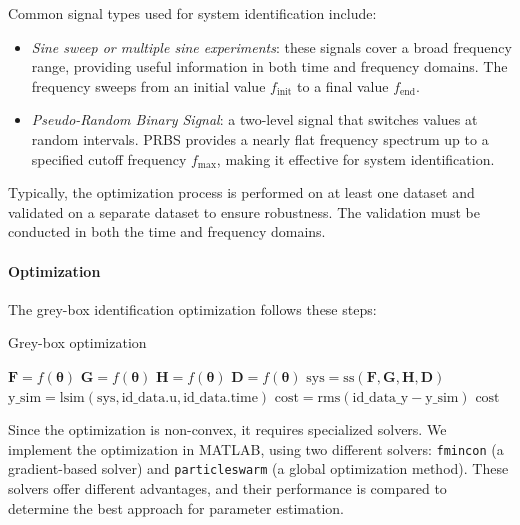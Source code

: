 Common signal types used for system identification include:
\begin{itemize}
    \item \textit{Sine sweep or multiple sine experiments}: these signals cover a broad frequency range, providing useful information in both time and frequency domains. 
        The frequency sweeps from an initial value $f_{\text{init}}$ to a final value $f_{\text{end}}$.
    \item \textit{Pseudo-Random Binary Signal}: a two-level signal that switches values at random intervals.
        PRBS provides a nearly flat frequency spectrum up to a specified cutoff frequency $f_{\text{max}}$, making it effective for system identification.
\end{itemize}
Typically, the optimization process is performed on at least one dataset and validated on a separate dataset to ensure robustness. 
The validation must be conducted in both the time and frequency domains.

\paragraph*{Optimization}
The grey-box identification optimization follows these steps:
\begin{algorithm}
    \caption{Grey-box optimization}
    \begin{algorithmic}[1]
        \State $\mathbf{F}=f(\boldsymbol{\theta})$
        \State $\mathbf{G}=f(\boldsymbol{\theta})$
        \State $\mathbf{H}=f(\boldsymbol{\theta})$
        \State $\mathbf{D}=f(\boldsymbol{\theta})$
        \State $\text{sys}=\text{ss}(\textbf{F},\textbf{G},\textbf{H},\textbf{D})$ 
        \State $\text{y}\_\text{sim}=\text{lsim}(\text{sys}, \text{id\_data.u}, \text{id\_data.time})$ 
        \State $\text{cost} = \text{rms}(\text{id}\_\text{data}\_\text{y}-\text{y}\_\text{sim})$ 
        \State \Return $\text{cost}$
    \end{algorithmic}
\end{algorithm}

\noindent Since the optimization is non-convex, it requires specialized solvers.
We implement the optimization in MATLAB, using two different solvers: \texttt{fmincon} (a gradient-based solver) and \texttt{particleswarm} (a global optimization method). 
These solvers offer different advantages, and their performance is compared to determine the best approach for parameter estimation.